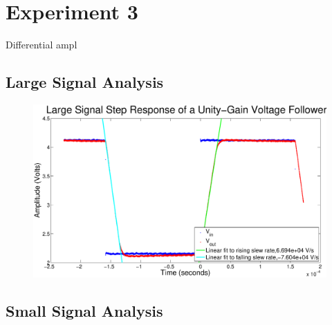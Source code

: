 \section*{Experiment 3}

Differential ampl


\subsection*{Large Signal Analysis}


\begin{figure}[H]
\centering
\includegraphics[width=\linewidth]{../Figures/Exp3P1.eps}
\caption{}
\label{fig:exp3p1}
\end{figure}

\subsection*{Small Signal Analysis}



